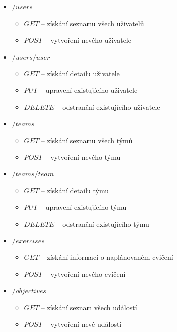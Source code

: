 \documentclass[
  digital, %
  twoside, %
  table,   %
  nolof,     %
  nolot,     %
]{fithesis3}
\begin{document}
\renewcommand\labelitemii{$\square$}
\begin{itemize}
    \item $/users$
    \begin{itemize}
        \item $GET$ -- získání seznamu všech uživatelů
        \item $POST$ --  vytvoření nového uživatele
    \end{itemize}
    
    \item $/users/{user}$
    \begin{itemize}
        \item $GET$ -- získání detailu uživatele
        \item $PUT$ -- upravení existujícího uživatele
        \item $DELETE$ -- odstranění existujícího uživatele
    \end{itemize}
    
    \item $/teams$
    \begin{itemize}
        \item $GET$ -- získání seznamu všech týmů
        \item $POST$ --  vytvoření nového týmu
    \end{itemize}
    
    \item $/teams/{team}$
    \begin{itemize}
        \item $GET$ -- získání detailu týmu
        \item $PUT$ -- upravení existujícího týmu
        \item $DELETE$ -- odstranění existujícího týmu
    \end{itemize}
    
    \item $/exercises$
    \begin{itemize}
        \item $GET$ -- získání informací o naplánovaném cvičení
        \item $POST$ -- vytvoření nového cvičení
    \end{itemize}
    
    \item $/objectives$
    \begin{itemize}
        \item $GET$ -- získání seznam všech událostí
        \item $POST$ --  vytvoření nové události
    \end{itemize}
        

\end{itemize}
\end{document}
